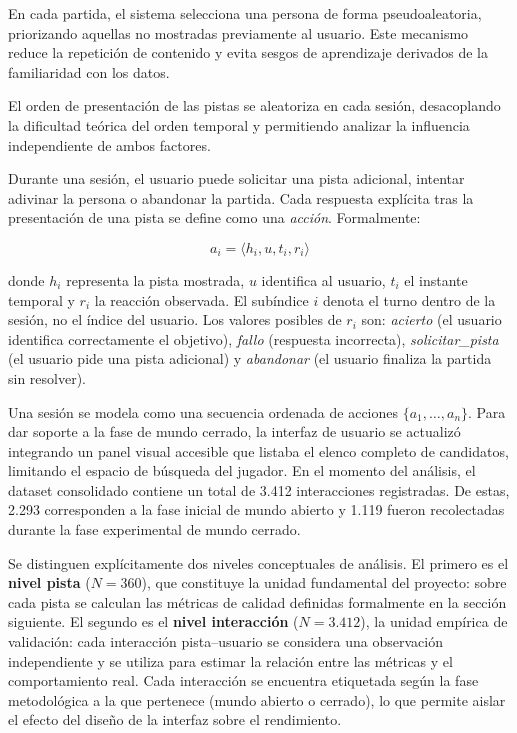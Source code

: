 \documentclass[../main.tex]{subfiles}
\begin{document}
En cada partida, el sistema selecciona una persona de forma pseudoaleatoria, priorizando aquellas no mostradas previamente al usuario. Este mecanismo reduce la repetición de contenido y evita sesgos de aprendizaje derivados de la familiaridad con los datos.

El orden de presentación de las pistas se aleatoriza en cada sesión, desacoplando la dificultad teórica del orden temporal y permitiendo analizar la influencia independiente de ambos factores.

Durante una sesión, el usuario puede solicitar una pista adicional, intentar adivinar la persona o abandonar la partida. Cada respuesta explícita tras la presentación de una pista se define como una \textit{acción}. Formalmente:

\[
a_i = \langle h_i, u, t_i, r_i \rangle
\]

donde $h_i$ representa la pista mostrada, $u$ identifica al usuario, $t_i$ el instante temporal y $r_i$ la reacción observada. El subíndice $i$ denota el turno dentro de la sesión, no el índice del usuario. Los valores posibles de $r_i$ son: \textit{acierto} (el usuario identifica correctamente el objetivo), \textit{fallo} (respuesta incorrecta), \textit{solicitar\_pista} (el usuario pide una pista adicional) y \textit{abandonar} (el usuario finaliza la partida sin resolver).

Una sesión se modela como una secuencia ordenada de acciones $\{a_1, \dots, a_n\}$. Para dar soporte a la fase de mundo cerrado, la interfaz de usuario se actualizó integrando un panel visual accesible que listaba el elenco completo de candidatos, limitando el espacio de búsqueda del jugador. En el momento del análisis, el dataset consolidado contiene un total de 3.412 interacciones registradas. De estas, 2.293 corresponden a la fase inicial de mundo abierto y 1.119 fueron recolectadas durante la fase experimental de mundo cerrado.

Se distinguen explícitamente dos niveles conceptuales de análisis. El primero es el \textbf{nivel pista} ($N = 360$), que constituye la unidad fundamental del proyecto: sobre cada pista se calculan las métricas de calidad definidas formalmente en la sección siguiente. El segundo es el \textbf{nivel interacción} ($N = 3.412$), la unidad empírica de validación: cada interacción pista--usuario se considera una observación independiente y se utiliza para estimar la relación entre las métricas y el comportamiento real. Cada interacción se encuentra etiquetada según la fase metodológica a la que pertenece (mundo abierto o cerrado), lo que permite aislar el efecto del diseño de la interfaz sobre el rendimiento.
\end{document}
